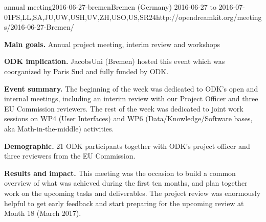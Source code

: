 \begin{event}{\ODK annual meeting}{2016-06-27-bremen}{Bremen (Germany) 2016-06-27 to 2016-07-01}{PS,LL,SA,JU,UW,USH,UV,ZH,USO,US,SR}{24}{http://opendreamkit.org/meetings/2016-06-27-Bremen/}

  \textbf{Main goals.} Annual project meeting, interim review and workshops

  \textbf{ODK implication.} JacobsUni (Bremen) hosted this event which
  was coorganized by Paris Sud and fully funded by ODK.

  \textbf{Event summary.} The beginning of the week was dedicated to
  ODK’s open and internal meetings, including an interim review with
  our Project Officer and three EU Commission reviewers. The rest of
  the week was dedicated to joint work sessions on WP4 (User
  Interfaces) and WP6 (Data/Knowledge/Software bases, aka
  Math-in-the-middle) activities.

  \textbf{Demographic.} 21 ODK participants together with ODK's
  project officer and three reviewers from the EU Commission.

  \textbf{Results and impact.} This meeting was the occasion to build
  a common overview of what was achieved during the first ten months,
  and plan together work on the upcoming tasks and deliverables. The
  project review was enormously helpful to get early feedback
  and start preparing for the upcoming review at Month 18
  (March 2017).


\end{event}
